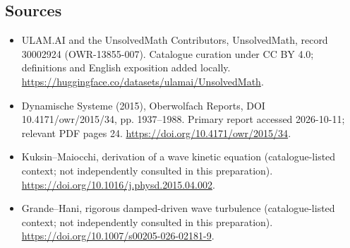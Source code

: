\documentclass[11pt]{article}
\begin{document}
\subsection{Sources}
\begin{itemize}
\item[\hypertarget{source:30002924:1}{S1}] ULAM.AI and the UnsolvedMath Contributors, UnsolvedMath, record 30002924 (OWR-13855-007). Catalogue curation under CC BY 4.0; definitions and English exposition added locally.
\url{https://huggingface.co/datasets/ulamai/UnsolvedMath}.
\item[\hypertarget{source:30002924:2}{S2}] Dynamische Systeme (2015), Oberwolfach Reports, DOI 10.4171/owr/2015/34, pp. 1937--1988. Primary report accessed 2026-10-11; relevant PDF pages 24.
\url{https://doi.org/10.4171/owr/2015/34}.
\item[\hypertarget{source:30002924:3}{S3}] Kuksin--Maiocchi, derivation of a wave kinetic equation (catalogue-listed context; not independently consulted in this preparation).
\url{https://doi.org/10.1016/j.physd.2015.04.002}.
\item[\hypertarget{source:30002924:4}{S4}] Grande--Hani, rigorous damped-driven wave turbulence (catalogue-listed context; not independently consulted in this preparation).
\url{https://doi.org/10.1007/s00205-026-02181-9}.
\end{itemize}
\label{end:30002924}
\end{document}
